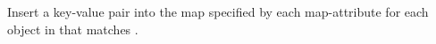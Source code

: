 Insert a key-value pair into the map specified by each map-attribute for each
object in  that matches .


